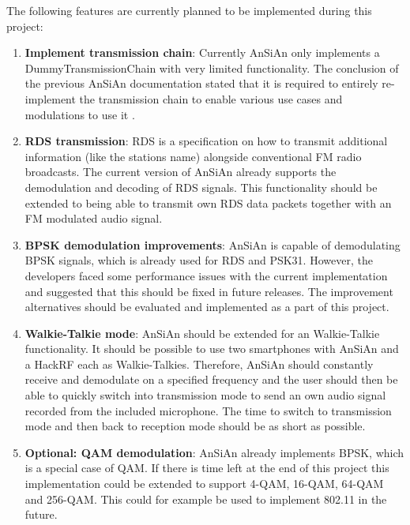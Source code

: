 	The following features are currently planned to be implemented during this project:
	
	\begin{enumerate}
		\item \textbf{Implement transmission chain}: Currently \ac{AnSiAn} only implements a DummyTransmissionChain with very limited functionality. The conclusion of the previous \ac{AnSiAn} documentation stated that it is required to entirely re-implement the transmission chain to enable various use cases and modulations to use it \cite{Mantz2016}. 
		
		\item \textbf{\ac{RDS} transmission}: \ac{RDS} is a specification on how to transmit additional information (like the stations name) alongside conventional FM radio broadcasts. The current version of \ac{AnSiAn} already supports the demodulation and decoding of RDS signals. This functionality should be extended to being able to transmit own RDS data packets together with an FM modulated audio signal. 
		
		\item \textbf{\acs{BPSK} demodulation improvements}: \ac{AnSiAn} is capable of demodulating \ac{BPSK} signals, which is already used for \ac{RDS} and PSK31. However, the developers faced some performance issues with the current implementation and suggested that this should be fixed in future releases. The improvement alternatives should be evaluated and implemented as a part of this project.
		
		\item \textbf{Walkie-Talkie mode}: \ac{AnSiAn} should be extended for an Walkie-Talkie functionality. It should be possible to use two smartphones with \ac{AnSiAn} and a HackRF each as Walkie-Talkies. Therefore, \ac{AnSiAn} should constantly receive and demodulate on a specified frequency and the user should then be able to quickly switch into transmission mode to send an own audio signal recorded from the included microphone. The time to switch to transmission mode and then back to reception mode should be as short as possible. 
		
		\item \textbf{Optional: \acs{QAM} demodulation}: \ac{AnSiAn} already implements BPSK, which is a special case of \ac{QAM}. If there is time left at the end of this project this implementation could be extended to support 4-\ac{QAM}, 16-\ac{QAM}, 64-\ac{QAM} and 256-\ac{QAM}. This could for example be used to implement 802.11 in the future. 
	\end{enumerate}
	

